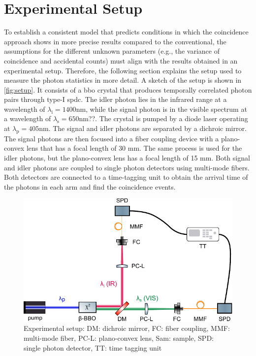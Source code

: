 \section{Experimental Setup}
To establish a consistent model that predicts conditions in which the coincidence approach shows in more precise results compared to the conventional, the assumptions for the different unknown parameters (e.g., the variance of coincidence and accidental counts) must align with the results obtained in an experimental setup. Therefore, the following section explains the setup used to measure the photon statistics in more detail. \newline
A sketch of the setup is shown in \autoref{fig:setup}. It consists of a \acrshort{bbo} crystal that produces temporally correlated photon pairs through type-I \acrshort{spdc}. The idler photon lies in the infrared range at a wavelength of $\lambda_{\text{i}} = 1400$nm, while the signal photon is in the visible spectrum at a wavelength of $\lambda_{\text{s}} = 650$nm??. The crystal is pumped by a diode laser operating at $\lambda_{\text{p}} = 405$nm. \newline
The signal and idler photons are separated by a dichroic mirror. The signal photons are then focused into a fiber coupling device with a plano-convex lens that has a focal length of 30 mm. The same process is used for the idler photons, but the plano-convex lens has a focal length of 15 mm. \newline
Both signal and idler photons are coupled to single photon detectors using multi-mode fibers. Both detectors are connected to a time-tagging unit to obtain the arrival time of the photons in each arm and find the coincidence events.  
\begin{figure}[tb!]
    \centering
    \includegraphics[width=.8\linewidth]{Images/DupishSetupNew.pdf}
    \caption[Experimental setup]{Experimental setup: DM: dichroic mirror, FC: fiber coupling, MMF: multi-mode fiber, PC-L: plano-convex lens, Sam: sample, SPD: single photon detector, TT: time tagging unit}
    \label{fig:setup}
\end{figure}

